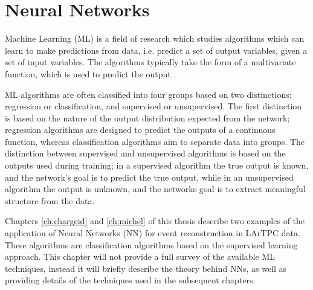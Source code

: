 \chapter{\label{ch:ml}Neural Networks} 

%
%
%
%

\minitoc

Machine Learning (ML) is a field of research which studies algorithms which 
can learn to make predictions from data, i.e. predict a set of output variables,
given a set of input variables. The algorithms typically take the form of a
multivariate function, which is used to predict the output \cite{Reed1999}.

ML algorithms are often classified into four groups based on two distinctions: 
regression or classification, and supervised or unsupervised. The first
distinction is based on the nature of the output distribution expected from the
network; regression algorithms are designed to predict the outputs of a 
continuous function, whereas classification algorithms aim to separate data 
into groups. The distinction between supervised and unsupervised algorithms is 
based on the outputs used during training; in a supervised algorithm the true 
output is known, and the network's goal is to predict the true output, while 
in an unsupervised algorithm the output is unknown, and the networks goal is 
to extract meaningful structure from the data.

Chapters \ref{ch:chargeid} and \ref{ch:michel} of this thesis describe two 
examples of the application of Neural Networks (NN) for event reconstruction 
in LArTPC data. These algorithms are classification algorithms based on the
supervised learning approach. This chapter will not provide a full survey of
the available ML techniques, instead it will briefly describe the theory 
behind NNs, as well as providing details of the techniques used in the 
subsequent chapters. 

